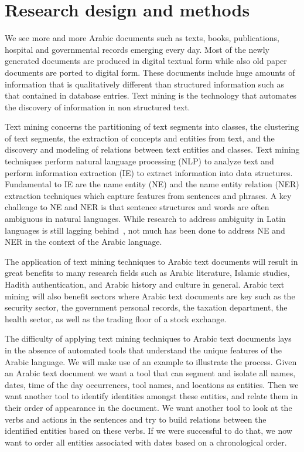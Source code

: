 \documentclass[12pt]{article}
\begin{document}
\section{Research design and methods}
\label{s:designmethods}

We see more and more Arabic documents such as texts,
 books,
 publications,
 hospital and governmental records emerging every day.
 Most of the newly generated documents are produced in digital textual form while also old paper documents are ported to digital form.
 These documents include huge amounts of information that is qualitatively different than structured information such as that contained in database entries.
 Text mining is the technology that automates the discovery of information in non structured text.

Text mining concerns the partitioning of text segments into classes,
 the clustering of text segments,
 the extraction of concepts and entities from text,
 and the discovery and modeling of relations between text entities and classes.
 Text mining techniques perform natural language processing (NLP) to analyze text and perform information extraction (IE) to extract information into data structures.
 Fundamental to IE are the name entity (NE) and the name entity relation (NER) extraction techniques which capture features from sentences and phrases.
 A key challenge to NE and NER is that sentence structures and words are often ambiguous in natural languages.
 While research to address ambiguity in Latin languages is still lagging behind~\cite{Red08},
 not much has been done to address NE and NER in the context of the Arabic language.

The application of text mining techniques to Arabic text documents will result in great benefits to many research fields such as Arabic literature,
 Islamic studies,
 Hadith authentication,
 and Arabic history and culture in general.
 Arabic text mining will also benefit sectors where Arabic text documents are key such as the security sector,
 the government personal records,
 the taxation department,
 the health sector,
 as well as the trading floor of a stock exchange.
 
The difficulty of applying text mining techniques to Arabic text documents lays in the absence of automated tools that understand the unique features of the Arabic language.
 We will make use of an example to illustrate the process.
 Given an Arabic text document we want a tool that can segment and isolate all names,
 dates,
 time of the day occurrences,
 tool names,
 and locations as entities.
 Then we want another tool to identify identities amongst these entities,
 and relate them in their order of appearance in the document.
 We want another tool to look at the verbs and actions in the sentences and try to build relations between the identified entities based on these verbs.
 If we were successful to do that,
 we now want to order all entities associated with dates based on a chronological order.
\end{document}
